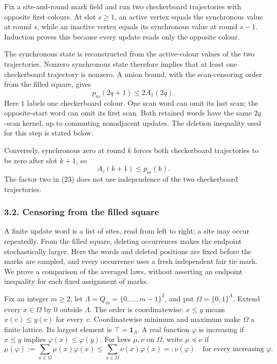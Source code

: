 \documentclass[
  11pt,
  a4paper,
]{article}
\begin{document}
Fix a site-and-round mark field and run two checkerboard trajectories
with opposite first colours. At slot \(s\geq1\), an active vertex equals
the synchronous value at round \(s\), while an inactive vertex equals
its synchronous value at round \(s-1\). Induction proves this because
every update reads only the opposite colour.

The synchronous state is reconstructed from the active-colour values of
the two trajectories. Nonzero synchronous state therefore implies that
at least one checkerboard trajectory is nonzero. A union bound, with the
scan-censoring order from the filled square, gives \[
p_m(2q+1)\leq2A_1(2q).
\tag{23}
\] Here \(1\) labels one checkerboard colour. One scan word can omit its
last scan; the opposite-start word can omit its first scan. Both
retained words have the same \(2q\)-scan kernel, up to commuting
nonadjacent updates. The deletion inequality used for this step is
stated below.

Conversely, synchronous zero at round \(k\) forces both checkerboard
trajectories to be zero after slot \(k+1\), so \[
A_c(k+1)\leq p_m(k).
\tag{24}
\] The factor two in (23) does not use independence of the two
checkerboard trajectories.

\subsubsection{3.2. Censoring from the filled
square}\label{censoring-from-the-filled-square}

A finite update word is a list of sites, read from left to right; a site
may occur repeatedly. From the filled square, deleting occurrences makes
the endpoint stochastically larger. Here the words and deleted positions
are fixed before the marks are sampled, and every occurrence uses a
fresh independent fair tie mark. We prove a comparison of the averaged
laws, without asserting an endpoint inequality for each fixed assignment
of marks.

Fix an integer \(m\geq2\), let \(\Lambda=Q_m=\{0,\ldots,m-1\}^2\), and
put \(\Omega=\{0,1\}^{\Lambda}\). Extend every \(x\in\Omega\) by \(0\)
outside \(\Lambda\). The order is coordinatewise: \(x\leq y\) means
\(x(v)\leq y(v)\) for every \(v\). Coordinatewise minimum and maximum
make \(\Omega\) a finite lattice. Its largest element is
\(\top=\mathbf1_\Lambda\). A real function \(\varphi\) is increasing if
\(x\leq y\) implies \(\varphi(x)\leq\varphi(y)\). For laws \(\mu,\nu\)
on \(\Omega\), write \(\mu\preceq\nu\) if \[
\mu(\varphi):=\sum_{x\in\Omega}\mu(x)\varphi(x)
\leq\sum_{x\in\Omega}\nu(x)\varphi(x)=:\nu(\varphi)
\quad\text{for every increasing }\varphi.
\tag{C1}
\]
\end{document}
